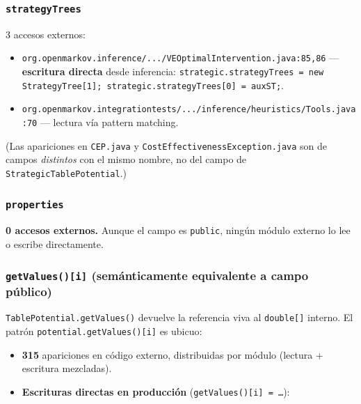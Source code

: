 \documentclass[11pt,a4paper]{article}
\newcommand{\code}[1]{\texttt{#1}}
\newcommand{\bad}[1]{\textcolor{codered}{\textbf{#1}}}
\newcommand{\good}[1]{\textcolor{codegreen}{\textbf{#1}}}
\begin{document}
\subsubsection*{\code{strategyTrees}}

3 accesos externos:

\begin{itemize}[leftmargin=*,itemsep=2pt]
  \item \code{org.openmarkov.inference/.../VEOptimalIntervention.java:85,86}
        --- \bad{escritura directa} desde inferencia:
        \code{strategic.strategyTrees = new StrategyTree[1]; strategic.strategyTrees[0] = auxST;}.
  \item \code{org.openmarkov.integrationtests/.../inference/heuristics/Tools.java:70}
        --- lectura vía pattern matching.
\end{itemize}

(Las apariciones en \code{CEP.java} y \code{CostEffectivenessException.java}
son de campos \emph{distintos} con el mismo nombre, no del campo de
\code{StrategicTablePotential}.)

\subsubsection*{\code{properties}}

\good{0 accesos externos.} Aunque el campo es \code{public}, ningún módulo
externo lo lee o escribe directamente.

\subsubsection*{\code{getValues()[i]} (semánticamente equivalente a campo
público)}

\code{TablePotential.getValues()} devuelve la referencia viva al \code{double[]}
interno. El patrón \code{potential.getValues()[i]} es ubicuo:

\begin{itemize}[leftmargin=*]
  \item \textbf{315} apariciones en código externo, distribuidas por módulo
        (lectura + escritura mezcladas).
  \item \textbf{Escrituras directas en producción} (\code{getValues()[i] = \dots}):
\end{itemize}
\end{document}
